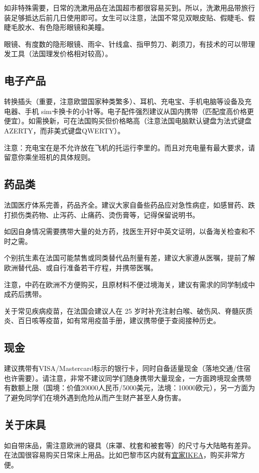 \documentclass[UTF8]{ctexart}
\begin{document}
如非特殊需要，日常的洗漱用品在法国超市都很容易买到。所以，洗漱用品带旅行装足够抵达后前几日使用即可。女生可以注意，法国不常见双眼皮贴、假睫毛、假睫毛胶水、有色隐形眼镜和美瞳。

眼镜、有度数的隐形眼镜、雨伞、针线盒、指甲剪刀、剃须刀，有技术的可以带理发工具（法国理发价格相对较高）。

\subsection{电子产品}

转换插头（重要，注意欧盟国家种类繁多）、耳机、充电宝、手机电脑等设备及充电器、手机 sim卡换卡的小针等。电子配件强烈建议从国内携带（匹配度高价格更便宜）。如需换新，可在法国购买但价格略高（注意法国电脑默认键盘为法式键盘AZERTY，而非美式键盘QWERTY）。

注意：充电宝在是不允许放在飞机的托运行李里的。而且对充电量有最大要求，请留意你乘坐班机的具体规则。

\subsection{药品类}
法国医疗体系完善，药品齐全。建议大家自备些药品应对急性病症，如感冒药、跌打损伤类药物、止泻药、止痛药、烫伤膏等，记得保留说明书。

如因自身情况需要携带大量的处方药，找医生开好中英文证明，以备海关检查和不时之需。

个别抗生素在法国可能禁售或同类替代品剂量有差，建议大家遵从医嘱，提前了解欧洲替代品、或自行准备若干疗程，并携带医嘱。

注意，中药在欧洲不方便购买，且原材料不便过境海关，建议有需求的同学制成中成药后携带。

关于常见疾病疫苗，在法国会建议人在 25 岁时补充注射白喉、破伤风、脊髓灰质炎、百日咳等疫苗，如有常用疫苗手册，建议携带便于查阅接种历史。

\subsection{现金}
建议携带有VISA/Mastercard标示的银行卡，同时自备适量现金（落地交通/住宿也许需要）。请注意，非常不建议同学们随身携带大量现金，一方面跨境现金携带有数额上限（国境：价值20000人民币/5000美元，法境：10000欧元），另一方面为了避免同学们在境外遇到危险从而产生财产甚至人身伤害。

\subsection{关于床具}
如自带床品，需注意欧洲的寝具（床罩、枕套和被套等）的尺寸与大陆略有差异。在法国很容易购买日常床上用品。比如巴黎市区内就有\href{https://goo.gl/maps/zMbCesV2jhi92mcK9}{宜家IKEA}，购买非常方便。
\end{document}
